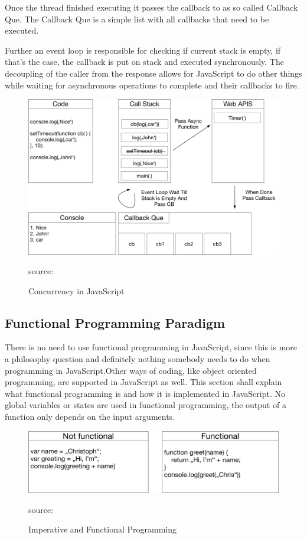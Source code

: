 Once the thread finished executing it passes the callback to as so called Callback Que. The Callback Que is a simple list with all callbacks that need to be executed. 

Further an event loop is responsible for checking if current stack is empty, if that's the case, the callback is put on stack and executed synchronously. The decoupling of the caller from the response allows for JavaScript to do other things while waiting for asynchronous operations to complete and their callbacks to fire. 

\begin{figure}[H]
	\centering
	\includegraphics[width=\linewidth]{bilder/grundlagen/Concurrency.png}
	\caption{Concurrency in JavaScript} source:\cite{Concurrency}
	\label{fig:CC}
\end{figure}

\subsection{Functional Programming Paradigm}
There is no need to use functional programming in JavaScript, since this is more a philosophy question and definitely nothing somebody needs to do when programming in JavaScript.Other ways of coding, like object oriented programming, are supported in JavaScript as well. This section shall explain what functional programming is and how it is implemented in JavaScript. No global variables or states are used in functional programming, the output of a function only depends on the input arguments.

\begin{figure}[H]
	\centering
	\includegraphics[width=\linewidth]{bilder/grundlagen/fp.png}
	\caption{Imperative and Functional Programming} source:\cite{FP}
	\label{fig:FP}
\end{figure}

